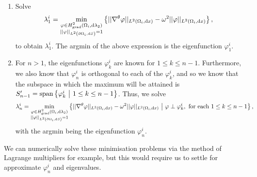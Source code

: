 \begin{enumerate}
	\item Solve
	\begin{align*}
		\lambda_1^i &= \min_{\substack{\varphi\in H^2_\mathrm{grad}\left( \Omega_i, \mathrm{d}\lambda_2 \right) \\ \lvert\lvert \varphi \rvert\rvert_{L^{2}\left( \partial\Omega_i,\mathrm{d}S \right)}=1}} \left\{  \lvert\lvert \nabla^{\theta} \varphi \rvert\rvert_{L^{2}\left( \Omega_i,\mathrm{d}x \right)} - \omega^2 \lvert\lvert \varphi \rvert\rvert_{L^{2}\left( \Omega_i,\mathrm{d}x \right)}  \right\},
	\end{align*}
	to obtain $\lambda_1^i$.
	The argmin of the above expression is the eigenfunction $\varphi_1^i$.
	\item For $n>1$, the eigenfunctions $\varphi_k^i$ are known for $1\leq k\leq n-1$.
	Furthermore, we also know that $\varphi_n^i$ is orthogonal to each of the $\varphi_k^i$, and so we know that the subspace in which the maximum will be attained is $S'_{n-1} = \mathrm{span}\left\{ \varphi_k^i \ \middle\vert \  1\leq k\leq n-1 \right\}$.
	Thus, we solve
	\begin{align*}
		\lambda_n^i &= \min_{\substack{\varphi\in H^2_\mathrm{grad}\left( \Omega_i, \mathrm{d}\lambda_2 \right) \\ \lvert\lvert \varphi \rvert\rvert_{L^{2}\left( \partial\Omega_i,\mathrm{d}S \right)}=1}} \left\{  \lvert\lvert \nabla^{\theta} \varphi \rvert\rvert_{L^{2}\left( \Omega_i,\mathrm{d}x \right)} - \omega^2 \lvert\lvert \varphi \rvert\rvert_{L^{2}\left( \Omega_i,\mathrm{d}x \right)} \ \middle\vert \  \varphi\perp\varphi_k^i, \text{ for each } 1\leq k\leq n-1  \right\},
	\end{align*}
	with the argmin being the eigenfunction $\varphi_n^i$.
\end{enumerate}
We can numerically solve these minimisation problems via the method of Lagrange multipliers for example, but this would require us to settle for approximate $\varphi_n^i$ and eigenvalues.